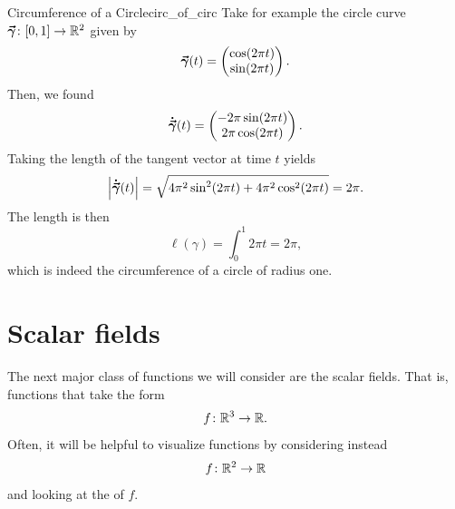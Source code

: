         \begin{ex}{Circumference of a Circle}{circ_of_circ}
        	Take for example the circle curve $\boldsymbol{\vec{\gamma}} \colon [0,1] \to \mathbb{R}^2$ given by
        	\[
        	\boldsymbol{\vec{\gamma}}(t) = \begin{pmatrix} \cos(2\pi t) \\ \sin(2\pi t) \end{pmatrix}.
        	\]
        	Then, we found 
        	\[
        	\boldsymbol{\dot{\vec{\gamma}}}(t) = \begin{pmatrix} -2\pi \sin(2\pi t) \\ 2\pi \cos(2 \pi t) \end{pmatrix}.
        	\]
        	Taking the length of the tangent vector at time $t$ yields
        	\[
        	\left| \boldsymbol{\dot{\vec{\gamma}}}(t) \right| = \sqrt{4\pi^2 \sin^2(2\pi t) + 4\pi^2 \cos^2(2\pi t) } = 2\pi.
        	\]
        	The length is then
        	\[
        	\ell(\gamma) = \int_0^1 2 \pi t  = 2\pi,
        	\]
        	which is indeed the circumference of a circle of radius one.
        \end{ex}
                
                \section{Scalar fields}
                The next major class of functions we will consider are the scalar fields.  That is, functions that take the form
                \[
                f\colon \mathbb{R}^3 \to \mathbb{R}.
                \]
                Often, it will be helpful to visualize functions by considering instead
                \[
                f\colon \mathbb{R}^2 \to \mathbb{R}
                \]
                and looking at the  of $f$.  
                
